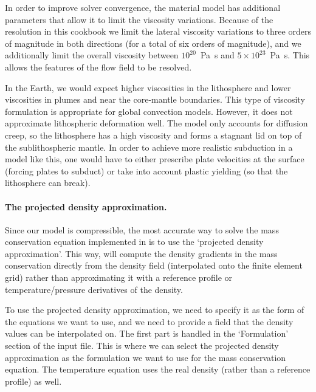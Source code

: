 In order to improve solver convergence, the material model has additional parameters that allow it to limit the viscosity variations. 
Because of the resolution in this cookbook we limit the lateral viscosity variations to 
three orders of magnitude in both directions (for a total of six orders of
magnitude), and we additionally limit the overall viscosity
between $10^{20}$~\si{\pascal\second} and $5 \times 10^{23}$~\si{\pascal\second}. This allows the features of the flow field to be resolved. 

In the Earth, we would expect higher viscosities in the lithosphere and 
lower viscosities in plumes and near the core-mantle boundaries. 
This type of viscosity formulation is appropriate for global convection models. 
However, it does not approximate lithospheric deformation well. 
The model only accounts for diffusion creep, so the 
lithosphere has a high viscosity and forms a stagnant lid on top of the 
sublithospheric mantle. In order to achieve more realistic subduction in a model like this, 
one would have to either prescribe plate velocities at the surface 
(forcing plates to subduct) or take into account plastic yielding (so that
the lithosphere can break).


\paragraph{The projected density approximation.}
Since our model is compressible, the most accurate way to solve the mass 
conservation equation implemented in \aspect{} is to use the `projected density
approximation'. This way, \aspect{} will compute the density gradients in the 
mass conservation directly from the density field (interpolated onto the 
finite element grid) rather than approximating it with a reference profile 
or temperature/pressure derivatives of the density. 

To use the projected density approximation, we need to specify it as the form of the equations we want to use, and we need to provide a field that the density values can be interpolated on. 
The first part is handled in the `Formulation' section of the input file. This is where we can select 
the projected density approximation as the formulation we want to use for the mass conservation equation. 
The temperature equation uses the real density (rather than a reference profile) as well. 

